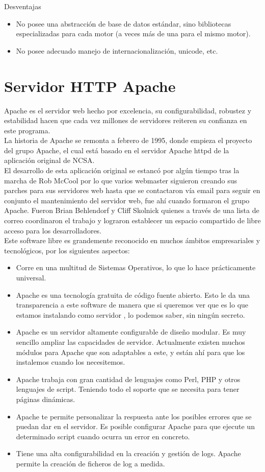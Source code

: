 Desventajas
\begin{itemize}
\item No posee una abstracci\'on de base de datos est\'andar, sino bibliotecas especializadas para cada motor (a veces m\'as de una para el mismo motor).
\item No posee adecuado manejo de internacionalizaci\'on, unicode, etc.
\end{itemize}

\section{Servidor HTTP Apache}
Apache es el servidor web hecho por excelencia, su configurabilidad, robustez y estabilidad hacen que cada vez millones de servidores reiteren su confianza en este programa.\\
La historia de Apache se remonta a febrero de 1995, donde empieza el proyecto del grupo Apache, el cual est\'a basado en el servidor Apache httpd de la aplicaci\'on original de NCSA.\\
El desarrollo de esta aplicaci\'on original se estanc\'o por alg\'un tiempo tras la marcha de Rob McCool por lo que varios webmaster siguieron creando sus parches para sus servidores web hasta que se contactaron v\'ia email para seguir en conjunto el mantenimiento del servidor web, fue ah\'i cuando formaron el grupo Apache. \cite{apache_server}
Fueron Brian Behlendorf y Cliff Skolnick quienes a trav\'es de una lista de correo coordinaron el trabajo y lograron establecer un espacio compartido de libre acceso para los desarrolladores.\\
Este software libre es grandemente reconocido en muchos \'ambitos empresariales y tecnol\'ogicos, por los siguientes aspectos: 
\begin{itemize}
\item Corre en una multitud de Sistemas Operativos, lo que lo hace pr\'acticamente universal.
\item Apache es una tecnolog\'ia gratuita de c\'odigo fuente abierto. Esto le da una transparencia a este software de manera que si queremos ver que es lo que estamos instalando como servidor , lo podemos saber, sin ning\'un secreto.
\item Apache es un servidor altamente configurable de dise\~no modular. Es muy sencillo ampliar las capacidades de servidor. Actualmente existen muchos m\'odulos para Apache que son adaptables a este, y est\'an ah\'i para que los instalemos cuando los necesitemos. 
\item Apache trabaja con gran cantidad de lenguajes como Perl, PHP y otros lenguajes de script. Teniendo todo el soporte que se necesita para tener p\'aginas din\'amicas.
\item Apache te permite personalizar la respuesta ante los posibles errores que se puedan dar en el servidor. Es posible configurar Apache para que ejecute un determinado script cuando ocurra un error en concreto.
\item Tiene una alta configurabilidad en la creaci\'on y gesti\'on de logs. Apache permite la creaci\'on de ficheros de log a medida.
\end{itemize}

